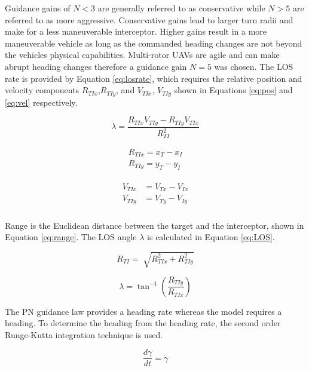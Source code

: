 \documentclass[conference]{IEEEtran}
\begin{document}
Guidance gains of $N < 3$ are generally referred to as conservative while $N > 5$ are referred to as more aggressive. Conservative gains lead to larger turn radii and make for a less maneuverable interceptor. Higher gains result in a more maneuverable vehicle as long as the commanded heading changes are not beyond the vehicles physical capabilities. Multi-rotor UAVs are agile and can make abrupt heading changes therefore a guidance gain $N = 5$ was chosen. The LOS rate is provided by Equation \ref{eq:losrate}, which requires the relative position and velocity components $R_{TIx}$,$R_{TIy}$, and $V_{TIx}$, $V_{TIy}$ shown in Equations \ref{eq:pos} and \ref{eq:vel} respectively. 

\begin{equation} \label{eq:losrate}
\dot{\lambda} = \frac{R_{TIx}V_{TIy}-R_{TIy}V_{TIx}}{R_{TI}^2}
\end{equation}

\begin{equation} \label{eq:pos}
\begin{split}
R_{TIx} = x_T-x_I\\
R_{TIy} = y_T-y_I
\end{split}
\end{equation}

\begin{align}
\label{eq:vel}
\begin{split}
V_{TIx} &= V_{Tx}-V_{Ix}
\\
V_{TIy} &= V_{Ty}-V_{Iy}
\\
\end{split}
\end{align}

Range is the Euclidean distance between the target and the interceptor, shown in Equation \ref{eq:range}. The LOS angle $\lambda$ is calculated in Equation \ref{eq:LOS}. 

\begin{equation} \label{eq:range}
R_{TI} =\sqrt[]{R_{TIx}^2+R_{TIy}^2}
\end{equation}

\begin{equation} \label{eq:LOS}
\lambda = \tan^{-1} \left(\frac{R_{TIy}}{R_{TIx}}\right)
\end{equation}

The PN guidance law provides a heading rate whereas the model requires a heading. To determine the heading from the heading rate, the second order Runge-Kutta integration technique is used. 

\begin{equation} \label{gamma}
\frac{d\gamma}{dt} = \dot{\gamma}
\end{equation}
\end{document}
